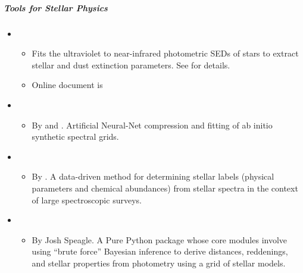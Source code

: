 \documentclass[letterpaper,10pt,english]{sphinxmanual}
\begin{document}
\subparagraph{Tools for Stellar Physics}
\label{\detokenize{resource/astro/topics/stellar_and_spops:tools-for-stellar-physics}}\begin{itemize}
\item {} 
\begin{itemize}
\item {} 
Fits the ultraviolet to near-infrared photometric SEDs of stars to
extract stellar and dust extinction parameters. See 
for details.

\item {} 
Online document is

\end{itemize}

\item {} 
\begin{itemize}
\item {} 
By 
and . Artificial
Neural-Net compression and fitting of ab initio synthetic spectral
grids.

\end{itemize}

\item {} 
\begin{itemize}
\item {} 
By . A data-driven method
for determining stellar labels (physical parameters and chemical
abundances) from stellar spectra in the context of large
spectroscopic surveys.

\end{itemize}

\item {} 
\begin{itemize}
\item {} 
By Josh Speagle. A Pure Python package whose core modules involve
using “brute force” Bayesian inference to derive distances,
reddenings, and stellar properties from photometry using a grid of
stellar models.


\end{itemize}
\end{itemize}
\end{document}
